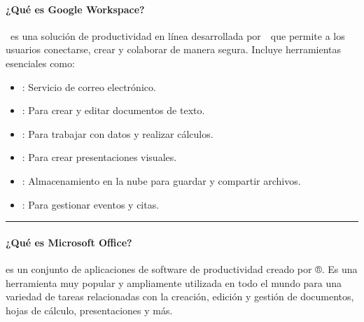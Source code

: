 \documentclass[letterpaper,10pt,spanish]{sphinxmanual}
\begin{document}
\paragraph{¿Qué es Google Workspace?}
\label{\detokenize{cursos/ofimatica10/periodo01/R01:que-es-google-workspace}}
\sphinxAtStartPar
{} es una solución de productividad en línea desarrollada por  que permite a los usuarios conectarse, crear y colaborar de manera segura. Incluye herramientas esenciales como:
\begin{itemize}
\item {} 
\sphinxAtStartPar
{}: Servicio de correo electrónico.

\item {} 
\sphinxAtStartPar
{}: Para crear y editar documentos de texto.

\item {} 
\sphinxAtStartPar
{}: Para trabajar con datos y realizar cálculos.

\item {} 
\sphinxAtStartPar
{}: Para crear presentaciones visuales.

\item {} 
\sphinxAtStartPar
{}: Almacenamiento en la nube para guardar y compartir archivos.

\item {} 
\sphinxAtStartPar
{}: Para gestionar eventos y citas.

\end{itemize}


\bigskip\hrule\bigskip



\paragraph{¿Qué es Microsoft Office?}
\label{\detokenize{cursos/ofimatica10/periodo01/R01:que-es-microsoft-office}}
\sphinxAtStartPar
{} es un conjunto de aplicaciones de software de productividad creado por ®. Es una herramienta muy popular y ampliamente utilizada en todo el mundo para una variedad de tareas relacionadas con la creación, edición y gestión de documentos, hojas de cálculo, presentaciones y más.
\end{document}
